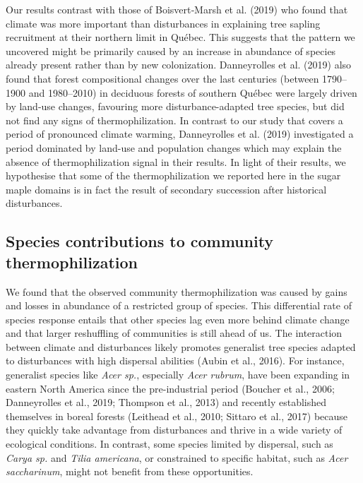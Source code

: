 \documentclass[
  a4paperpaper,
]{article}
\begin{document}
Our results contrast with those of Boisvert‐Marsh et al. (2019) who
found that climate was more important than disturbances in explaining
tree sapling recruitment at their northern limit in Québec. This
suggests that the pattern we uncovered might be primarily caused by an
increase in abundance of species already present rather than by new
colonization. Danneyrolles et al. (2019) also found that forest
compositional changes over the last centuries (between 1790--1900 and
1980--2010) in deciduous forests of southern Québec were largely driven
by land-use changes, favouring more disturbance-adapted tree species,
but did not find any signs of thermophilization. In contrast to our
study that covers a period of pronounced climate warming, Danneyrolles
et al. (2019) investigated a period dominated by land-use and population
changes which may explain the absence of thermophilization signal in
their results. In light of their results, we hypothesise that some of
the thermophilization we reported here in the sugar maple domains is in
fact the result of secondary succession after historical disturbances.

\hypertarget{species-contributions-to-community-thermophilization}{%
\subsection{Species contributions to community
thermophilization}\label{species-contributions-to-community-thermophilization}}

We found that the observed community thermophilization was caused by
gains and losses in abundance of a restricted group of species. This
differential rate of species response entails that other species lag
even more behind climate change and that larger reshuffling of
communities is still ahead of us. The interaction between climate and
disturbances likely promotes generalist tree species adapted to
disturbances with high dispersal abilities (Aubin et al., 2016). For
instance, generalist species like \emph{Acer sp.}, especially \emph{Acer
rubrum}, have been expanding in eastern North America since the
pre-industrial period (Boucher et al., 2006; Danneyrolles et al., 2019;
Thompson et al., 2013) and recently established themselves in boreal
forests (Leithead et al., 2010; Sittaro et al., 2017) because they
quickly take advantage from disturbances and thrive in a wide variety of
ecological conditions. In contrast, some species limited by dispersal,
such as \emph{Carya sp.} and \emph{Tilia americana}, or constrained to
specific habitat, such as \emph{Acer saccharinum}, might not benefit
from these opportunities.
\end{document}
